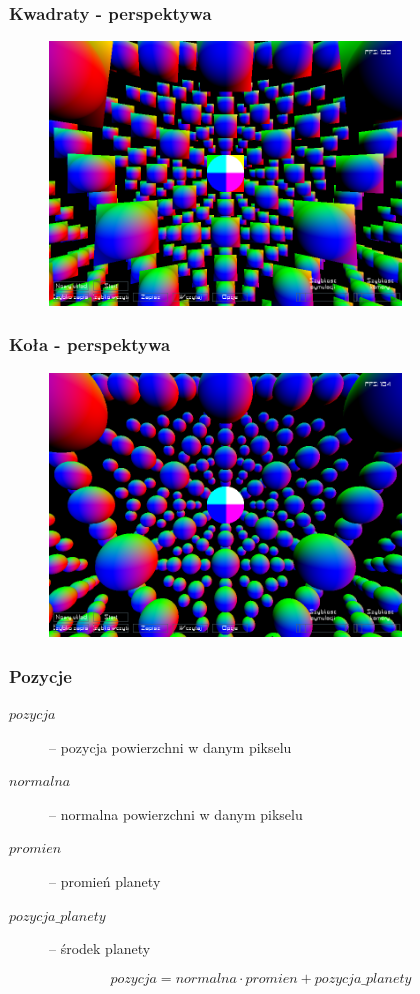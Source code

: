 \documentclass{beamer}
\begin{document}
\frame
{
	\frametitle{Kwadraty - perspektywa}
	\begin{figure}
	\centering
		\includegraphics[height=7cm]{img/per1.png}
	\label{fig:per1}
	\end{figure}
}

\frame
{
	\frametitle{Koła - perspektywa}
	\begin{figure}
	\centering
		\includegraphics[height=7cm]{img/per2.png}
	\label{fig:per2}
	\end{figure}
	\setcounter{subfigure}{0}
}

\frame
{
	\frametitle{Pozycje}

	\begin{description}
	\item[$pozycja$] -- pozycja powierzchni w danym pikselu
	\item[$normalna$] -- normalna powierzchni w danym pikselu
	\item[$promien$] -- promień planety
	\item[$pozycja\_planety$] -- środek planety
	\end{description}

	$$ pozycja = normalna \cdot promien + pozycja\_planety $$
}
\end{document}
